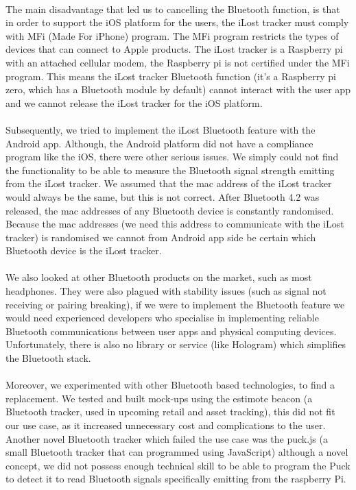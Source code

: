 \documentclass[12pt,a4paper]{article}
\begin{document}
        \paragraph{} The main disadvantage that led us to cancelling the Bluetooth function, is that in order to support the iOS platform for the users, the iLost tracker must comply with MFi (Made For iPhone) program. The MFi program restricts the types of devices that can connect to Apple products. The iLost tracker is a Raspberry pi with an attached cellular modem, the Raspberry pi is not certified under the MFi program. This means the iLost tracker Bluetooth function (it’s a Raspberry pi zero, which has a Bluetooth module by default) cannot interact with the user app and we cannot release the iLost tracker for the iOS platform.
        
        \paragraph{} Subsequently, we tried to implement the iLost Bluetooth feature with the Android app. Although, the Android platform did not have a compliance program like the iOS, there were other serious issues. We simply could not find the functionality to be able to measure the Bluetooth signal strength emitting from the iLost tracker.  We assumed that the mac address of the iLost tracker would always be the same, but this is not correct. After Bluetooth 4.2 was released, the mac addresses of any Bluetooth device is constantly randomised. Because the mac addresses (we need this address to communicate with the iLost tracker) is randomised we cannot from Android app side be certain which Bluetooth device is the iLost tracker. 
        
        \paragraph{} We also looked at other Bluetooth products on the market, such as most headphones. They were also plagued with stability issues (such as signal not receiving or pairing breaking), if we were to implement the Bluetooth feature we would need experienced developers who specialise in implementing reliable Bluetooth communications between user apps and physical computing devices. Unfortunately, there is also no library or service (like Hologram) which simplifies the Bluetooth stack. 
        
        \paragraph{} Moreover, we experimented with other Bluetooth based technologies, to find a replacement. We tested and built mock-ups using the estimote beacon (a Bluetooth tracker, used in upcoming retail and asset tracking), this did not fit our use case, as it increased unnecessary cost and complications to the user. Another novel Bluetooth tracker which failed the use case was the puck.js (a small Bluetooth tracker that can programmed using JavaScript) although a novel concept, we did not possess enough technical skill to be able to program the Puck to detect it to read Bluetooth signals specifically emitting from the raspberry Pi. 
        
\end{document}

